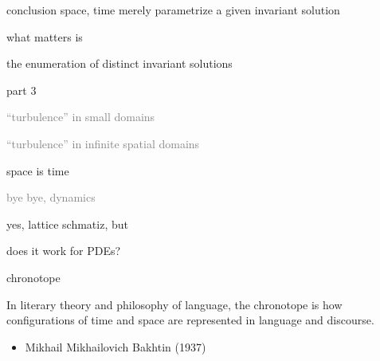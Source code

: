 \begin{frame}{conclusion}
space, time  merely parametrize a given invariant solution

\bigskip

what matters is

\vfill

{\Large
the enumeration of distinct invariant solutions
                  }
\end{frame}


\begin{frame}{part 3}
\begin{enumerate}
              \item
    \textcolor{gray}{\small
``turbulence'' in small domains
              \item
``turbulence'' in infinite spatial domains
        }
              \item
    {\Large
space is time
    }\textcolor{gray}{\small
              \item
bye bye, dynamics
                    }
            \end{enumerate}
\end{frame}

\begin{frame}{yes, lattice schmatiz, but}
\begin{center}
{\huge does it work for PDEs?}
\end{center}
\end{frame}


\begin{frame}{chronotope
}
\begin{bartlett}{
In literary theory and philosophy of language, the chronotope is how
configurations of time and space are represented in language and
discourse.
                }
\end{bartlett}

\bigskip
\bigskip

\begin{itemize}
  \item Mikhail Mikhailovich Bakhtin (1937)
\end{itemize}
\end{frame}

